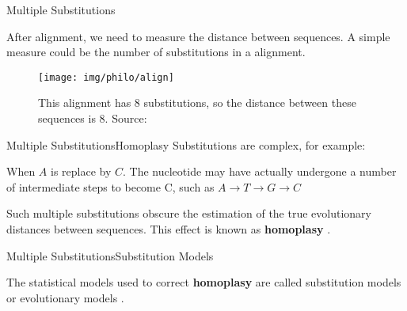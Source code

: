 \documentclass[10pt]{beamer}
\newcommand{\1}{
	\setbeamertemplate{background}{
		\texttt{[image: img/1]}
		\tikz[overlay] \fill[fill opacity=0.75,fill=white] (0,0) rectangle (-\paperwidth,\paperheight);
	}
}
\begin{document}
\begin{frame}{Multiple Substitutions}{}
	\begin{block}{}
		After alignment, we need to measure the distance between sequences. A simple measure could be the number of substitutions in a alignment.
	\end{block}

	\begin{figure}
		\texttt{[image: img/philo/align]}
		\caption{This alignment has 8 substitutions, so the distance between these sequences is 8.
			Source: \cite{xiong2006essential}}			
	\end{figure}
\end{frame}

\begin{frame}{Multiple Substitutions}{Homoplasy}
Substitutions are complex, for example:
	\begin{block}{}
		When $A$ is replace by $C$. The nucleotide may have actually undergone a
		number of intermediate steps to become C, such as $A 	\rightarrow T 	\rightarrow  G 	\rightarrow C$
	\end{block}

\vspace{0.5cm}
Such multiple substitutions obscure the estimation of the true evolutionary distances between sequences. This effect is known as \textbf{homoplasy} \cite{xiong2006essential}.
\end{frame}

\begin{frame}{Multiple Substitutions}{Substitution Models}

	\begin{block}{}
		The statistical models used to correct \textbf{homoplasy} are called substitution models or evolutionary models \cite{xiong2006essential}.
	\end{block}

\end{frame}
\end{document}
